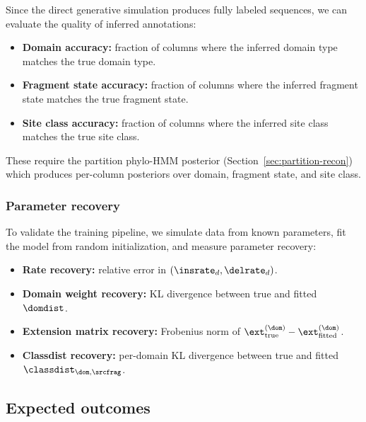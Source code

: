 Since the direct generative simulation produces fully labeled sequences,
we can evaluate the quality of inferred annotations:
\begin{itemize}
\item \textbf{Domain accuracy:} fraction of columns where the inferred
  domain type matches the true domain type.
\item \textbf{Fragment state accuracy:} fraction of columns where the
  inferred fragment state matches the true fragment state.
\item \textbf{Site class accuracy:} fraction of columns where the
  inferred site class matches the true site class.
\end{itemize}
These require the partition phylo-HMM posterior
(Section~\ref{sec:partition-recon}) which produces per-column
posteriors over domain, fragment state, and site class.

\subsubsection{Parameter recovery}

To validate the training pipeline, we simulate data from known
parameters, fit the model from random initialization, and measure
parameter recovery:
\begin{itemize}
\item \textbf{Rate recovery:} relative error in $(\insrate_d, \delrate_d)$.
\item \textbf{Domain weight recovery:} KL divergence between true and
  fitted $\domdist$.
\item \textbf{Extension matrix recovery:} Frobenius norm of
  $\ext^{(\dom)}_{\text{true}} - \ext^{(\dom)}_{\text{fitted}}$.
\item \textbf{Classdist recovery:} per-domain KL divergence between
  true and fitted $\classdist_{\dom,\srcfrag}$.
\end{itemize}

\subsection{Expected outcomes}

